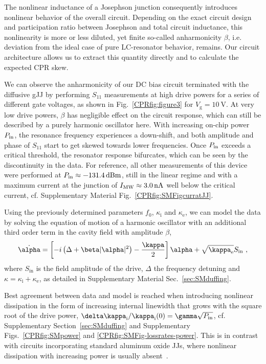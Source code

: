 The nonlinear inductance of a Josephson junction consequently introduces nonlinear behavior of the overall circuit.
%
Depending on the exact circuit design and participation ratio between Josephson and total circuit inductance, this nonlinearity is more or less diluted, yet finite so-called anharmonicity $\beta$, i.e. deviation from the ideal case of pure LC-resonator behavior, remains.
%
Our circuit architecture allows us to extract this quantity directly and to calculate the expected CPR skew.

We can observe the anharmonicity of our DC bias circuit terminated with the diffusive gJJ by performing $S_{11}$ measurements at high drive powers for a series of different gate voltages, as shown in Fig.~\ref{CPRfig:figure3} for $V_\text{g}=\SI{+10}{\volt}$.
%
At very low drive powers, $\beta$ has negligible effect on the circuit response, which can still be described by a purely harmonic oscillator here.
%
With increasing on-chip power $P_{\rm in}$, the resonance frequency experiences a down-shift, and both amplitude and phase of $S_{11}$ start to get skewed towards lower frequencies.
%
Once $P_{\rm in}$ exceeds a critical threshold, the resonator response bifurcates, which can be seen by the discontinuity in the data.
%
For reference, all other measurements of this device were performed at $P_{\rm in}\approx\SI{-131.4}{dBm}$, still in the linear regime and with a maximum current at the junction of $I_{\rm MW}\approx\SI{3.0}{\nano\ampere}$ well below the critical current, cf. Supplementary Material Fig.~\ref{CPRfig:SMFigcurratJJ}.

Using the previously determined parameters $f_0$, $\kappa_\text{i}$ and $\kappa_\text{e}$, we can model the data by solving the equation of motion of a harmonic oscillator with an additional third order term in the cavity field with amplitude $\beta$, 
%
\begin{align}
\dot{\alpha} = \left[ -i \left( \Delta+\beta\abs{\alpha}^2 \right)-\frac{\kappa}{2} \right]\alpha + \sqrt{\kappa_\text{e}} S_\text{in}\ ,
\label{CPReq:Duffing-EOM}
\end{align}
%
where $S_\text{in}$ is the field amplitude of the drive, $\Delta$ the frequency detuning and $\kappa=\kappa_\text{i}+\kappa_\text{e}$, as detailed in Supplementary Material Sec.~\ref{sec:SMduffing}.


Best agreement between data and model is reached when introducing nonlinear dissipation in the form of increasing internal linewidth that grows with the square root of the drive power, $\delta\kappa_\text{i}/\kappa_\text{i}(0)=\gamma \sqrt{P_{\rm in}}$, cf. Supplementary Section~\ref{sec:SMduffing} and Supplementary Figs.~\ref{CPRfig:SMpower} and \ref{CPRfig:SMFig-lossrates-power}.
%
This is in contrast with circuits incorporating standard aluminum oxide JJs, where nonlinear dissipation with increasing power is usually absent~\cite{boakninDispersiveMicrowaveBifurcation2007b}.

